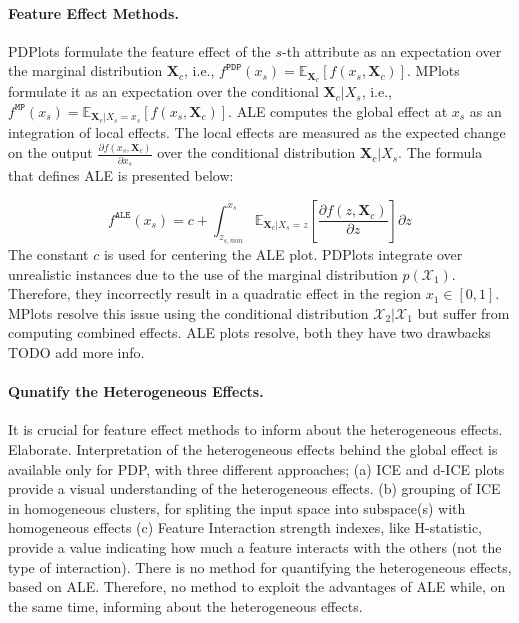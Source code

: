 \documentclass[twoside]{article}
\newcommand{\Xcb}{\mathbf{X}_c}
\begin{document}
\paragraph{Feature Effect Methods.} PDPlots formulate the feature
effect of the \(s\)-th attribute as an expectation over the marginal
distribution \(\mathbf{X}_c\), i.e.,
\(f^{\mathtt{PDP}}(x_s) =
\mathbb{E}_{\mathbf{X}_c}[f(x_s,\mathbf{X}_c)]\). MPlots formulate it
as an expectation over the conditional \(\mathbf{X}_c|X_s\), i.e.,
\(f^{\mathtt{MP}}(x_s) = \mathbb{E}_{\mathbf{X}_c|X_s = x_s}[f(x_s,
\mathbf{X}_c)]\). ALE computes the global effect at \(x_s\) as an
integration of local effects. The local effects are measured as the
expected change on the output
\( \frac{\partial f(x_s, \mathbf{X}_c)}{\partial x_s} \) over the
conditional distribution \( \Xcb|X_s\). The formula that
defines ALE is presented below:

\begin{equation}
  \label{eq:ALE_accumulated_mean}
  f^{\mathtt{ALE}}(x_s) = c + \int_{z_{s,min}}^{x_s} \mathbb{E}_{\Xcb|X_s=z}\left[\frac{\partial f(z, \Xcb)}{\partial z}\right] \partial z
\end{equation}
%
The constant \(c\) is used for centering the ALE plot. PDPlots
integrate over unrealistic instances due to the use of the marginal
distribution \( p(\mathcal{X}_1) \). Therefore, they incorrectly
result in a quadratic effect in the region \(x_1 \in [0, 1]\). MPlots
resolve this issue using the conditional distribution
\( \mathcal{X}_2|\mathcal{X}_1 \) but suffer from computing combined
effects. ALE plots resolve, both they have two drawbacks TODO add more
info.

\paragraph{Qunatify the Heterogeneous Effects.} It is crucial for
feature effect methods to inform about the heterogeneous
effects. Elaborate. Interpretation of the heterogeneous effects behind
the global effect is available only for PDP, with three different
approaches; (a) ICE and d-ICE plots provide a visual understanding of
the heterogeneous effects. (b) grouping of ICE in homogeneous
clusters, for spliting the input space into subspace(s) with
homogeneous effects (c) Feature Interaction strength indexes, like
H-statistic, provide a value indicating how much a feature interacts
with the others (not the type of interaction). There is no method for
quantifying the heterogeneous effects, based on ALE. Therefore, no
method to exploit the advantages of ALE while, on the same time,
informing about the heterogeneous effects.
\end{document}
